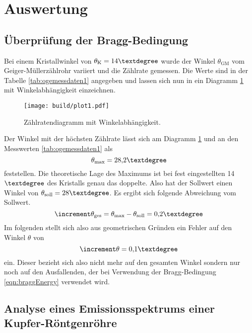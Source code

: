 \section{Auswertung}

\subsection{Überprüfung der Bragg-Bedingung}

Bei einem Kristallwinkel von $\theta_{\text{K}} = 14{\textdegree}$ wurde der Winkel $\theta_{\text{GM}}$ vom Geiger-Müllerzählrohr variiert und die Zählrate gemessen.
Die Werte sind in der Tabelle \ref{tab:ogemessdaten1} angegeben und lassen sich nun in ein Diagramm \ref{fig:plot1} mit Winkelabhängigkeit einzeichnen.
\begin{figure}[h]
  \centering
  \texttt{[image: build/plot1.pdf]}
  \caption{Zählratendiagramm mit Winkelabhängigkeit.}
  \label{fig:plot1}
\end{figure}
Der Winkel mit der höchsten Zählrate lässt sich am Diagramm \ref{fig:plot1} und an den Messwerten \ref{tab:ogemessdaten1} als
\begin{equation}
\theta_{\text{max}} = 28{,}2{\textdegree}
\end{equation}
feststellen.
Die theoretische Lage des Maximums ist bei fest eingestellten 14$\textdegree$ des Kristalls genau das doppelte. Also hat der Sollwert einen Winkel von $\theta_{\text{soll}} = 28{\textdegree}$. Es ergibt sich folgende Abweichung vom Sollwert.
\begin{equation}
\increment \theta_{\text{ges}} = \theta_{\text{max}} - \theta_{\text{soll}} = 0{,}2{\textdegree}
\end{equation}
Im folgenden stellt sich also aus geometrischen Gründen ein Fehler auf den Winkel $\theta$ von
\begin{equation}
\label{eqn:fehlerwinkel}
\increment \theta = 0{,}1{\textdegree}
\end{equation}
ein. Dieser bezieht sich also nicht mehr auf den gesamten Winkel sondern nur noch auf den Ausfallenden, der bei Verwendung der Bragg-Bedingung \eqref{eqn:braggEnergy}
verwendet wird.

\subsection{Analyse eines Emissionsspektrums einer Kupfer-Röntgenröhre}

